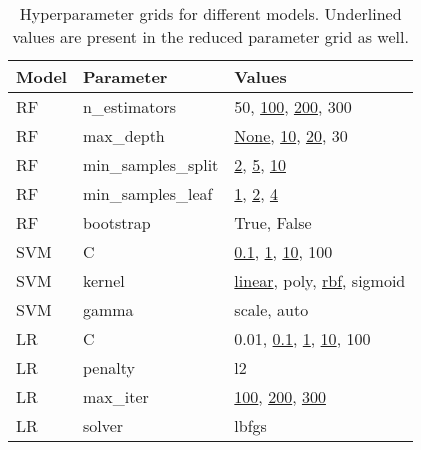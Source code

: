 
    \begin{table}
        \begin{tabular}{lll}
        \toprule
        Model & Parameter & Values \\
        \midrule
            RF & n\_estimators & 50, \underline{100}, \underline{200}, 300 \\
        RF & max\_depth & \underline{None}, \underline{10}, \underline{20}, 30 \\
        RF & min\_samples\_split & \underline{2}, \underline{5}, \underline{10} \\
        RF & min\_samples\_leaf & \underline{1}, \underline{2}, \underline{4} \\
        RF & bootstrap & True, False \\
        SVM & C & \underline{0.1}, \underline{1}, \underline{10}, 100 \\
        SVM & kernel & \underline{linear}, poly, \underline{rbf}, sigmoid \\
        SVM & gamma & scale, auto \\
        LR & C & 0.01, \underline{0.1}, \underline{1}, \underline{10}, 100 \\
        LR & penalty & l2 \\
        LR & max\_iter & \underline{100}, \underline{200}, \underline{300} \\
        LR & solver & lbfgs \\

        \bottomrule
        \end{tabular}
        \caption{Hyperparameter grids for different models. Underlined values are present in the reduced parameter grid as well.}
        \label{tab:grid_params}
    \end{table}
    